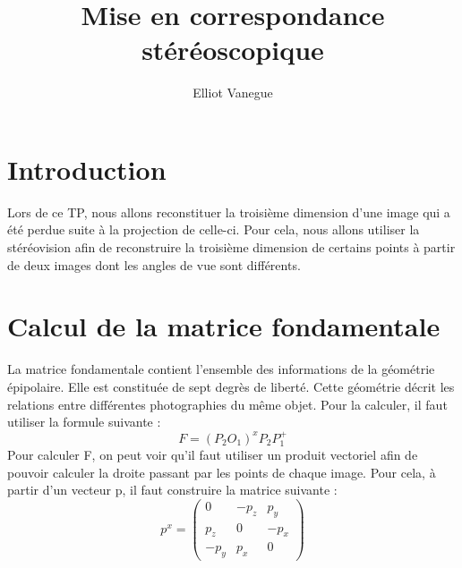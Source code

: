 \documentclass[a4paper,10pt]{article}
\title{Mise en correspondance stéréoscopique}
\author{Elliot Vanegue}
\begin{document}
\maketitle

\section{Introduction}
Lors de ce TP, nous allons reconstituer la troisième dimension d'une image
qui a été perdue suite à la projection de celle-ci. Pour cela, nous allons 
utiliser la stéréovision afin de reconstruire la troisième dimension de certains points à
partir de deux images dont les angles de vue sont différents.

\section{Calcul de la matrice fondamentale}
La matrice fondamentale contient l'ensemble des informations de la géométrie épipolaire.
Elle est constituée de sept degrès de liberté. Cette géométrie décrit les relations entre
différentes photographies du même objet. Pour la calculer, il faut utiliser la formule suivante :
\begin{equation}
 F=(P_2O_1)^xP_2P^+_1
 \label{fondamentale}
\end{equation}
Pour calculer F, on peut voir qu'il faut utiliser un produit vectoriel afin de 
pouvoir calculer la droite passant par les points de chaque image. Pour cela,
à partir d'un vecteur p, il faut construire la matrice suivante :
\begin{equation}
 p^x=\begin{pmatrix}
  0 & -p_z & p_y\\
  p_z & 0 & -p_x\\
  -p_y & p_x & 0
 \end{pmatrix}
 \label{vectoriel}
\end{equation}
\end{document}
